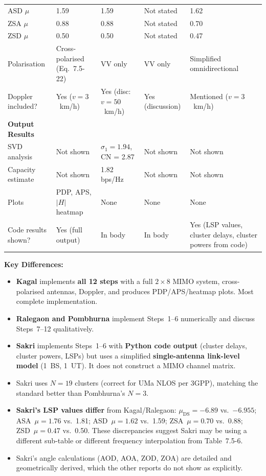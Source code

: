 \documentclass[11pt,a4paper]{article}
\newcommand{\uniq}[1]{\cellcolor{uniquecolor}#1}
\begin{document}
\begin{table}[H]
{\begin{tabular}{@{}p{4cm}p{3.2cm}p{3.2cm}p{3.2cm}p{3.5cm}@{}}
ASD $\mu$ & 1.59 & 1.59 & Not stated & 1.62 \\
ZSA $\mu$ & 0.88 & 0.88 & Not stated & 0.70 \\
ZSD $\mu$ & 0.50 & 0.50 & Not stated & 0.47 \\
\midrule
Polarisation & Cross-polarised (Eq.~7.5-22) & VV only & VV only & Simplified omnidirectional \\
Doppler included? & \uniq{Yes ($v = 3$~km/h)} & Yes (disc: $v = 50$~km/h) & Yes (discussion) & Mentioned ($v = 3$~km/h) \\
\midrule
\textbf{Output Results} & & & & \\
SVD analysis & Not shown & \uniq{$\sigma_1 = 1.94$, CN = 2.87} & Not shown & Not shown \\
Capacity estimate & Not shown & \uniq{1.82 bps/Hz} & Not shown & Not shown \\
Plots & \uniq{PDP, APS, $|H|$ heatmap} & None & None & None \\
Code results shown? & Yes (full output) & In body & In body & \uniq{Yes (LSP values, cluster delays, cluster powers from code)} \\
\bottomrule
\end{tabular}}%
\end{table}

\noindent\textbf{Key Differences:}
\begin{itemize}
    \item \textcolor{accentblue}{\textbf{Kagal}} implements \textbf{all 12 steps} with a full $2 \times 8$ MIMO system, cross-polarised antennas, Doppler, and produces PDP/APS/heatmap plots. Most complete implementation.
    \item \textbf{Ralegaon and Pombhurna} implement Steps~1--6 numerically and discuss Steps~7--12 qualitatively.
    \item \textbf{Sakri} implements Steps~1--6 with \textbf{Python code output} (cluster delays, cluster powers, LSPs) but uses a simplified \textbf{single-antenna link-level model} (1~BS, 1~UT). It does not construct a MIMO channel matrix.
    \item Sakri uses $N = 19$ clusters (correct for UMa NLOS per 3GPP), matching the standard better than Pombhurna's $N = 3$.
    \item \textcolor{accentred}{\textbf{Sakri's LSP values differ}} from Kagal/Ralegaon: $\mu_{\text{DS}} = -6.89$ vs.\ $-6.955$; ASA~$\mu = 1.76$ vs.\ 1.81; ASD~$\mu = 1.62$ vs.\ 1.59; ZSA~$\mu = 0.70$ vs.\ 0.88; ZSD~$\mu = 0.47$ vs.\ 0.50. These discrepancies suggest Sakri may be using a different sub-table or different frequency interpolation from Table~7.5-6.
    \item Sakri's angle calculations (AOD, AOA, ZOD, ZOA) are detailed and geometrically derived, which the other reports do not show as explicitly.
\end{itemize}
\end{document}
